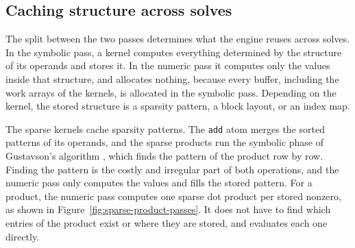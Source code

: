\subsection{Caching structure across solves}\label{sec:theme1-reusing-work}

The split between the two passes determines what the engine reuses across solves. In the
symbolic pass, a kernel computes everything determined by the structure of its operands
and stores it. In the numeric pass it computes only the values inside that structure, and
allocates nothing, because every buffer, including the work arrays of the kernels, is
allocated in the symbolic pass. Depending on the kernel, the stored structure is a
sparsity pattern, a block layout, or an index map.

The sparse kernels cache sparsity patterns.
The \texttt{add} atom merges the sorted patterns of its operands, and the sparse products
run the symbolic phase of Gustavson's algorithm \cite{gustavson1978two, bank1993smmp}, which
finds the
pattern of the product row by row. Finding the pattern is the costly and irregular part of
both operations, and the numeric pass only computes the values and fills the stored
pattern. For a product, the numeric
pass computes one sparse dot product per stored nonzero, as shown in
Figure~\ref{fig:sparse-product-passes}. It does not have to find which entries of the
product exist or where they are stored, and evaluates each one directly.

